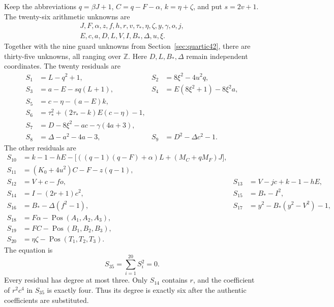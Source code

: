 Keep the abbreviations $q=\beta J+1$, $C=q-F-\alpha$,
$k=\eta+\zeta$, and put $s=2v+1$. The twenty-six arithmetic unknowns are
\begin{gather*}
 J,F,\alpha,z,f,h,r,v,\tau_*,\eta,\zeta,y,\gamma,o,j,\\
 E,c,a,D,L,V,I,B_*,\Delta,u,\xi.
\end{gather*}
Together with the nine guard unknowns from Section~\ref{sec:quartic42},
there are thirty-five unknowns, all ranging over $\mathbb Z$.
Here $D,L,B_*,\Delta$ remain independent coordinates. The twenty
residuals are
\begin{align}
 S_1&=L-q^2+1, &
 S_2&=8\xi^2-4u^2q, \nonumber\\
 S_3&=a-E-sq(L+1), &
 S_4&=E(8\xi^2+1)-8\xi^2a, \nonumber\\
 S_5&=c-\eta-(a-E)k, &&\nonumber\\
 S_6&=\tau_*^2+(2\tau_*-k)E(c-\eta)-1, &&\nonumber\\
 S_7&=D-8\xi^2-ac-\gamma(4a+3), &&\nonumber\\
 S_8&=\Delta-a^2-4a-3, &
 S_9&=D^2-\Delta c^2-1.
 \label{eq:sextic35-first}
\end{align}
The other residuals are
\begin{align}
 S_{10}&=k-1-hE
    -\bigl[((q-1)(q-F)+\alpha)L+(M_C+qM_F)J\bigr], \nonumber\\
 S_{11}&=(K_0+4u^2)C-F-z(q-1), \nonumber\\
 S_{12}&=V+c-fo, &
 S_{13}&=V-jc+k-1-hE, \nonumber\\
 S_{14}&=I-(2r+1)c^2, &
 S_{15}&=B_*-I^2, \nonumber\\
 S_{16}&=B_*-\Delta(f^2-1), &
 S_{17}&=y^2-B_*(y^2-V^2)-1, \nonumber\\
 S_{18}&=F\alpha-\operatorname{Pos}(A_1,A_2,A_3), &&\nonumber\\
 S_{19}&=FC-\operatorname{Pos}(B_1,B_2,B_3), &&\nonumber\\
 S_{20}&=\eta\zeta-\operatorname{Pos}(T_1,T_2,T_3). &&
 \label{eq:sextic35-second}
\end{align}
The equation is
\begin{equation}
 \boxed{\displaystyle S_{35}=\sum_{i=1}^{20}S_i^2=0.}
 \label{eq:sextic35}
\end{equation}
Every residual has degree at most three. Only $S_{14}$ contains $r$,
and the coefficient of $r^2c^4$ in $S_{35}$ is exactly four. Thus its
degree is exactly six after the authentic coefficients are substituted.

